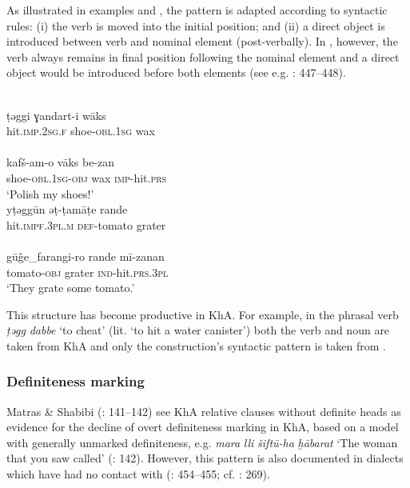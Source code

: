 \documentclass[output=paper,nonflat]{langsci/langscibook}
\begin{document}
As illustrated in examples  and , the pattern is adapted according to  syntactic rules: (i) the verb is moved into the initial position; and (ii) a direct object is introduced between verb and nominal element (post-verbally). In , however, the verb always remains in final position following the nominal element and a direct object would be introduced before both elements (see e.g. \citealt{Majidi1990}: 447–448).

\ea \label{taggi}
\\
\gll ṭəggi ɣandart-i wāks\\
     hit.\textsc{imp.2sg.f} shoe-\textsc{obl}.1\textsc{sg} wax\\
 
\\
\gll kafš-am-o vāks be-zan\\
     shoe-\textsc{obl.}1\textsc{sg-obj} wax \textsc{imp-}hit\textsc{.prs}\\
\glt ‘Polish my shoes!’
\z\ex \label{tamate}
\\
\gll yṭəggūn əṭ-ṭamāṭe rande\\
     hit.\textsc{impf.3pl.m} \textsc{def}{}-tomato grater \\
 
\\
\gll gūǧe\_farangi-ro rande mī-zanan\\
     tomato-\textsc{obj} grater \textsc{ind}-hit\textsc{.prs.3pl} \\
\glt ‘They grate some tomato.’
\z\z

This structure has become productive in KhA. For example, in the phrasal verb \textit{ṭəgg} \textit{dabbe} ‘to cheat’ (lit. ‘to hit a water canister’) both the verb and noun are taken from KhA and only the construction’s syntactic pattern is taken from . 

\subsubsection{Definiteness marking}

Matras \& Shabibi (\citeyear{MatrasShabibi2007}: 141–142) see KhA {relative} clauses without {definite} heads as evidence for the decline of overt {definiteness} marking in KhA, based on a  model with generally unmarked {definiteness}, e.g. \textit{mara} \textit{lli} \textit{šiftū-ha} \textit{ḫābarat} ‘The woman that you saw called’ (\citeyear{MatrasShabibi2007}: 142). However, this pattern is also documented in  dialects which have had no contact with  (\citealt{Pat-El2017}: 454–455; cf. \citealt{Procházka2018Fertile}: 269).
\end{document}
